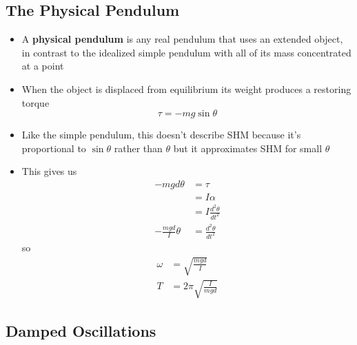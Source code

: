 \documentclass{article}
\begin{document}
\subsection{The Physical Pendulum}

\begin{itemize}
    \item A \textbf{physical pendulum} is any real pendulum that uses an extended object, in contrast to the idealized simple pendulum with all of its mass concentrated at a point

    \item When the object is displaced from equilibrium its weight produces a restoring torque \[\tau = -mg\sin\theta\]

    \item Like the simple pendulum, this doesn't describe SHM because it's proportional to $\sin\theta$ rather than $\theta$ but it approximates SHM for small $\theta$

    \item This gives us
          \begin{align*}
              -mgd\theta           & = \tau                     \\
                                   & = I\alpha                  \\
                                   & = I\frac{d^2 \theta}{dt^2} \\
              -\frac{mgd}{I}\theta & = \frac{d^2 \theta}{dt^2}
          \end{align*}
          so
          \begin{align*}
              \omega & = \sqrt{\frac{mgd}{I}}      \\
              T      & = 2\pi \sqrt{\frac{I}{mgd}}
          \end{align*}
\end{itemize}

\subsection{Damped Oscillations}
\end{document}
